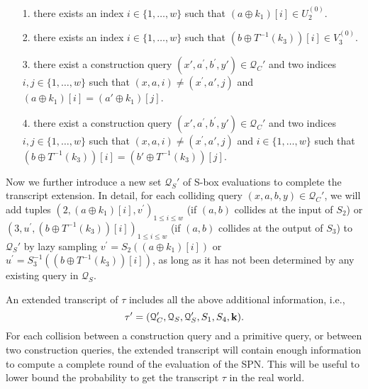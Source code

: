 \begin{itemize}
	\item[1.] there exists an index $i \in\{1, \ldots, w\}$ such that $\left(a \oplus k_1\right)[i]\in U_2^{(0)}$.
	\item[2.] there exists an index $i \in\{1, \ldots, w\}$ such that $\left(b \oplus T^{-1}(k_3)\right)[i]\in V_3^{(0)}$.
	\item[3.] there exist a construction query $\left(x',a^{\prime}, b^{\prime},y'\right) \in \mathcal{Q}_{C}'$ and two indices $i,j \in\{1, \ldots, w\}$ such that $(x, a,i) \neq\left(x^{\prime},a', j\right)$ and $\left(a \oplus k_1\right)[i] = \left(a' \oplus k_1\right)[j]$.
	\item[4.] there exist a construction query $\left(x',a^{\prime}, b^{\prime},y'\right) \in \mathcal{Q}_{C}'$ and two indices $i,j \in\{1, \ldots, w\}$ such that $(x,a, i) \neq\left(x^{\prime},a', j\right)$ and $i \in\{1, \ldots, w\}$ such that $\left(b \oplus T^{-1}(k_3)\right)[i] = \left(b' \oplus T^{-1}(k_3)\right)[j]$.
\end{itemize}
%
%
Now we further introduce a new set $\mathcal{Q}_{S}'$ of S-box evaluations to complete the transcript extension. In detail, for each colliding query $(x,a,b,y)\in\mathcal{Q}_C'$, we will add tuples $\left(2, (a \oplus k_1)[i], v^{\prime}\right)_{1 \leq i \leq w}$ (if $(a, b)$ collides at the input of $S_2$) or $\left(3, u^{\prime}, (b \oplus T^{-1}(k_3))[i]\right)_{1 \leq i \leq w}$ (if $(a, b)$ collides at the output of $S_3$) to $\mathcal{Q}_{S}'$ by lazy sampling $v^{\prime}=S_2((a \oplus k_1)[i])$ or $u^{\prime}=S_3^{-1}((b \oplus T^{-1}(k_3))[i])$, as long as it has not been determined by any existing query in $\mathcal{Q}_S$.


An extended transcript of $\tau$ includes all the above additional information, i.e.,
%
$$\tau'=(\mathcal{Q}_{C}',\mathcal{Q}_{S},\mathcal{Q}_{S}',S_1,S_4,\mathbf{k}).$$
%
For each collision between a construction query and a primitive query, or between two construction queries, the extended transcript will contain enough information to compute a complete round of the evaluation of the SPN. This will be useful to lower bound the probability to get the transcript $\tau$ in the real world.


